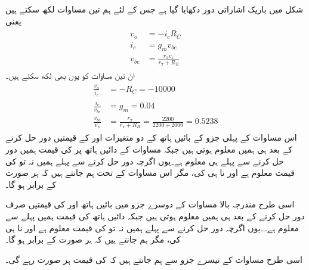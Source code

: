 شکل   میں باریک اشاراتی دور دکھایا گیا ہے جس کے لئے ہم تین مساوات لکھ سکتے ہیں یعنی
\begin{gather}
\begin{aligned}
v_o &=-i_c R_C\\
i_c &=g_m v_{be}\\
v_{be} &=\frac{r_{\pi} v_s}{r_{\pi}+R_B}
\end{aligned}
\end{gather}
ان تین مساوات کو یوں بھی لکھ سکتے ہیں۔
\begin{gather}  \label{مساوات_ٹرانزسٹر_شرح_کی_قیمتیں_الف}
\begin{aligned}
\frac{v_o}{i_c}&=-R_C = \num{-10000}\\
\frac{i_c}{v_{be}}&=g_m=\num{0.04}\\
\frac{v_{be}}{v_s}&=\frac{r_{\pi}}{r_{\pi}+R_B}=\frac{2200}{2200+2000}=\num{0.5238}
\end{aligned}
\end{gather}
اس مساوات کے پہلی جزو کے بائیں ہاتھ کے دو متغیرات  اور  کے قیمتیں دور حل کرنے کے بعد ہی ہمیں معلوم ہوتی ہیں جبکہ مساوات کے دائیں ہاتھ پر  کی قیمت  ہمیں دور حل کرنے سے پہلے ہی معلوم ہے۔یوں اگرچہ دور حل کرنے سے پہلے ہمیں نہ تو  کی قیمت معلوم ہے اور نا ہی  کی، مگر اس مساوات کے تحت ہم جانتے ہیں کہ  ہر صورت  کے برابر ہو گا۔


اسی طرح مندرجہ بالا مساوات کے دوسرے جزو میں بائیں ہاتھ  اور  کی قیمتیں صرف دور حل کرنے کے بعد ہی ہمیں معلوم ہوتی ہیں جبکہ دائیں ہاتھ  کی قیمت  ہمیں پہلے سے معلوم ہے۔۔یوں اگرچہ دور حل کرنے سے پہلے ہمیں نہ تو  کی قیمت معلوم ہے اور نا ہی  کی، مگر ہم جانتے ہیں کہ  ہر صورت  کے برابر ہو گا۔

اسی طرح مساوات کے تیسرے جزو سے ہم جانتے ہیں کہ  کی قیمت ہر صورت  رہے گی۔

